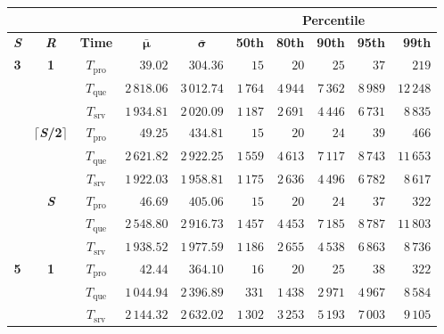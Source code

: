 \documentclass[11pt]{article}
\theoremstyle{definition}
\newcommand\Tque{T_{\mathrm{que}}}
\newcommand\Tsrv{T_{\mathrm{srv}}}
\newcommand\Tpro{T_{\mathrm{pro}}}
\renewcommand\b[1]{{\bf{#1}}}
\begin{document}
\begin{table}[h]
    \centering
    \small
    {
        \smallskip
        \begin{tabular}{|c|c|c||r|r||r|r|r|r|r|}
            \cline{6-10}
            \multicolumn{5}{c|}{} & \multicolumn{5}{c|}{\b{Percentile}}\\ 
            \hline
            \b{\textit S} & \b{\textit R} & \b{Time} & \multicolumn{1}{c|}{$\bm{\bar\mu}$} & \multicolumn{1}{c||}{$\bm{\bar\sigma}$} & \b{50th} & \b{80th} & \b{90th} & \b{95th} & \b{99th} \\
            \hline
            \hline
            \multirow{9}{*}{\b3} & \multirow{3}{*}{\b1} & $\Tpro$ & $39.02$ & $304.36$ & $15$ & $20$ & $25$ & $37$ & $219$ \\
            & & $\Tque$ & $2\,818.06$ & $3\,012.74$ & $1\,764$ & $4\,944$ & $7\,362$ & $8\,989$ & $12\,248$ \\
            & & $\Tsrv$ & $1\,934.81$ & $2\,020.09$ & $1\,187$ & $2\,691$ & $4\,446$ & $6\,731$ & $8\,835$ \\
            \cline{2-10}
            & \multirow{3}{*}{$\lceil$\b{\textit S/2}$\rceil$} & $\Tpro$ & $49.25$ & $434.81$ & $15$ & $20$ & $24$ & $39$ & $466$ \\
            & & $\Tque$ & $2\,621.82$ & $2\,922.25$ & $1\,559$ & $4\,613$ & $7\,117$ & $8\,743$ & $11\,653$ \\
            & & $\Tsrv$ & $1\,922.03$ & $1\,958.81$ & $1\,175$ & $2\,636$ & $4\,496$ & $6\,782$ & $8\,617$ \\
            \cline{2-10}
            & \multirow{3}{*}{\b{\textit S}} & $\Tpro$ & $46.69$ & $405.06$ & $15$ & $20$ & $24$ & $37$ & $322$ \\
            & & $\Tque$ & $2\,548.80$ & $2\,916.73$ & $1\,457$ & $4\,453$ & $7\,185$ & $8\,787$ & $11\,803$ \\
            & & $\Tsrv$ & $1\,938.52$ & $1\,977.59$ & $1\,186$ & $2\,655$ & $4\,538$ & $6\,863$ & $8\,736$ \\
            \hline
            \hline
            \multirow{9}{*}{\b5} & \multirow{3}{*}{\b1} & $\Tpro$ & $42.44$ & $364.10$ & $16$ & $20$ & $25$ & $38$ & $322$ \\
            & & $\Tque$ & $1\,044.94$ & $2\,396.89$ & $331$ & $1\,438$ & $2\,971$ & $4\,967$ & $8\,584$ \\
            & & $\Tsrv$ & $2\,144.32$ & $2\,632.02$ & $1\,302$ & $3\,253$ & $5\,193$ & $7\,003$ & $9\,105$ \\

\end{tabular}}
\end{table}
\end{document}
